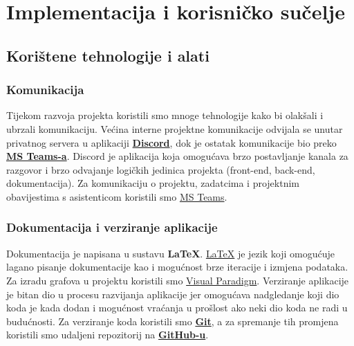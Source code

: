 \chapter{Implementacija i korisničko sučelje}
		
		
		\section{Korištene tehnologije i alati}
			
		\subsection*{Komunikacija}
			Tijekom razvoja projekta koristili smo mnoge tehnologije kako bi olakšali i ubrzali komunikaciju. Većina interne projektne komunikacije odvijala se unutar privatnog servera u aplikaciji \textbf{\href{https://discord.com/}{Discord}}, dok je ostatak komunikacije bio preko \textbf{\href{https://www.microsoft.com/hr-hr/microsoft-teams/download-app}{MS Teams-a}}.
			Discord je aplikacija koja omogućava brzo postavljanje kanala za razgovor i brzo odvajanje logičkih jedinica projekta (front-end, back-end, dokumentacija).
			Za komunikaciju o projektu, zadatcima i projektnim obavijestima s asistenticom koristili smo \href{https://www.microsoft.com/hr-hr/microsoft-teams/download-app}{MS Teams}.


		\subsection*{Dokumentacija i verziranje aplikacije}
			Dokumentacija je napisana u sustavu \textbf{LaTeX}. \href{https://www.latex-project.org/}{LaTeX} je jezik koji omogućuje lagano pisanje dokumentacije kao i mogućnost brze iteracije i izmjena podataka. Za izradu grafova u projektu koristili smo \href{https://www.visual-paradigm.com/}{Visual Paradigm}. Verziranje aplikacije je bitan dio u procesu razvijanja aplikacije jer omogućava nadgledanje koji dio koda je kada dodan i mogućnost vraćanja u prošlost ako neki dio koda ne radi u budućnosti. Za verziranje koda koristili smo \textbf{\href{https://git-scm.com/}{Git}}, a za spremanje tih promjena koristili smo udaljeni repozitorij na \textbf{\href{https://github.com/}{GitHub-u}}.


